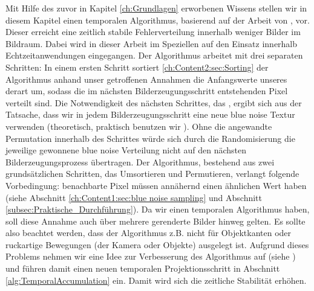 Mit Hilfe des zuvor in Kapitel \ref{ch:Grundlagen} erworbenen Wissens stellen wir in diesem Kapitel einen temporalen 
Algorithmus, basierend auf der Arbeit von \cite{hal02158423}, vor. Dieser erreicht eine zeitlich stabile 
 Fehlerverteilung innerhalb weniger Bilder im Bildraum. Dabei wird in 
dieser Arbeit im Speziellen auf den Einsatz innerhalb Echtzeitanwendungen eingegangen. 
Der Algorithmus arbeitet mit drei separaten Schritten: 
In einem ersten Schritt sortiert \ref{ch:Content2:sec:Sorting} der Algorithmus anhand unser getroffenen 
 Annahmen die Anfangswerte unseres 
derart um, sodass die im nächsten Bilderzeugungsschritt entstehenden Pixel 
verteilt sind. Die Notwendigkeit des nächsten Schrittes, das , ergibt sich 
aus der Tatsache, dass wir in jedem Bilderzeugungsschritt eine neue blue noise Textur verwenden (theoretisch,
praktisch benutzen wir ). Ohne die angewandte Permutation innerhalb 
des Schrittes würde sich durch die Randomisierung die jeweilige gewonnene blue noise Verteilung nicht auf den 
nächsten Bilderzeugungsprozess übertragen.  
Der Algorithmus, bestehend aus zwei grundsätzlichen Schritten, das Umsortieren und Permutieren, 
verlangt folgende Vorbedingung:
benachbarte Pixel müssen annähernd einen ähnlichen Wert haben (siehe Abschnitt \ref{ch:Content1:sec:blue noise sampling}
und Abschnitt \ref{subsec:Praktische_Durchführung}). Da wir einen temporalen Algorithmus haben, soll diese Annahme 
auch über mehrere gerenderte Bilder hinweg gelten. Es sollte also beachtet werden, dass der Algorithmus z.B. nicht 
für Objektkanten oder ruckartige Bewegungen (der Kamera oder Objekte) ausgelegt ist.
Aufgrund dieses Problems nehmen wir eine Idee zur Verbesserung des Algorithmus auf (siehe \cite{hal02158423}) und führen 
damit einen neuen temporalen Projektionsschritt in Abschnitt \ref{alg:TemporalAccumulation} ein. Damit wird sich die 
zeitliche Stabilität erhöhen.
 

